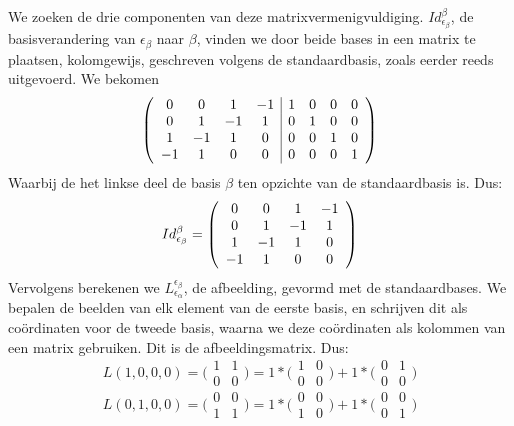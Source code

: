 \documentclass[lineaire_algebra_oplossingen.tex]{subfiles}
\begin{document}
We zoeken de drie componenten van deze matrixvermenigvuldiging. $Id^\beta_{\epsilon_\beta}$, de basisverandering van $\epsilon_\beta$ naar $\beta$, vinden we door beide bases in een matrix te plaatsen, kolomgewijs, geschreven volgens de standaardbasis, zoals eerder reeds uitgevoerd. We bekomen
\[
\left(
\begin{array}{c c c c | c c c c}
0 & 0 & 1 & -1 & 1 & 0 & 0 & 0 \\ 
0 & 1 & -1 & 1 & 0 & 1 & 0 & 0 \\ 
1 & -1 & 1 & 0 & 0 & 0 & 1 & 0 \\ 
-1 & 1 & 0 & 0 & 0 & 0 & 0 & 1 \\ 
\end{array}
\right)
\]
Waarbij de het linkse deel de basis $\beta$ ten opzichte van de standaardbasis is. Dus:
\[Id^\beta_{\epsilon_\beta} = \left(
\begin{array}{c c c c}
0 & 0 & 1 & -1 \\ 
0 & 1 & -1 & 1 \\ 
1 & -1 & 1 & 0 \\ 
-1 & 1 & 0 & 0 \\ 
\end{array}
\right)
\]
Vervolgens berekenen we $L^{\epsilon_\beta}_{\epsilon_\alpha}$, de afbeelding, gevormd met de standaardbases. We bepalen de beelden van elk element van de eerste basis, en schrijven dit als co\"ordinaten voor de tweede basis, waarna we deze co\"ordinaten als kolommen van een matrix gebruiken. Dit is de afbeeldingsmatrix. Dus:
\[L(1,0,0,0)=\bigl(\begin{smallmatrix} 1&1\\ 0&0 \end{smallmatrix} \bigr) = 1*\bigl(\begin{smallmatrix} 1&0\\ 0&0 \end{smallmatrix} \bigr) + 1*\bigl(\begin{smallmatrix} 0&1\\ 0&0 \end{smallmatrix} \bigr)\]
\[L(0,1,0,0)=\bigl(\begin{smallmatrix}0&0\\ 1&1 \end{smallmatrix} \bigr) = 1*\bigl(\begin{smallmatrix} 0&0\\ 1&0 \end{smallmatrix} \bigr) + 1*\bigl(\begin{smallmatrix} 0&0\\ 0&1 \end{smallmatrix} \bigr)\]
\end{document}
